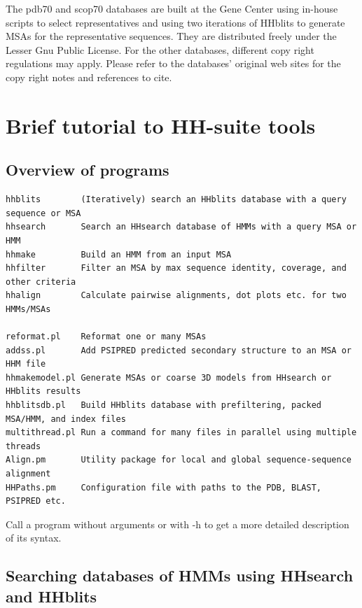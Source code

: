 \documentclass[11pt,a4paper]{article}
\begin{document}
The pdb70 and scop70 databases are built at the Gene Center using in-house scripts 
to select representatives and using two iterations of HHblits to generate MSAs for the 
representative sequences. They are distributed freely under the Lesser Gnu Public License. 
For the other databases, different copy right regulations may apply. 
Please refer to the databases' original web sites for the copy right notes and 
references to cite.


\section{Brief tutorial to HH-suite tools}

\subsection{Overview of programs}

\small 
\begin{verbatim}
hhblits        (Iteratively) search an HHblits database with a query sequence or MSA
hhsearch       Search an HHsearch database of HMMs with a query MSA or HMM
hhmake         Build an HMM from an input MSA 
hhfilter       Filter an MSA by max sequence identity, coverage, and other criteria
hhalign        Calculate pairwise alignments, dot plots etc. for two HMMs/MSAs

reformat.pl    Reformat one or many MSAs
addss.pl       Add PSIPRED predicted secondary structure to an MSA or HHM file
hhmakemodel.pl Generate MSAs or coarse 3D models from HHsearch or HHblits results	
hhblitsdb.pl   Build HHblits database with prefiltering, packed MSA/HMM, and index files
multithread.pl Run a command for many files in parallel using multiple threads
Align.pm       Utility package for local and global sequence-sequence alignment
HHPaths.pm     Configuration file with paths to the PDB, BLAST, PSIPRED etc.
\end{verbatim} 
\normalsize

Call a program without arguments or with -h to get a more detailed description of 
its syntax.


\subsection{Searching databases of HMMs using HHsearch and HHblits}\label{searching_hm_dbs}
\end{document}
